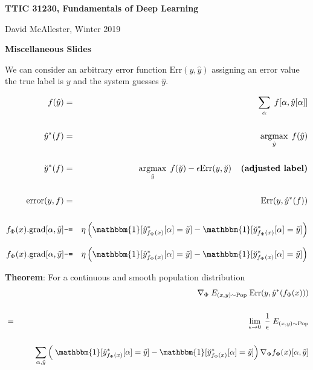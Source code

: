 




{\Huge

  \centerline{\bf TTIC 31230, Fundamentals of Deep Learning}
  \bigskip
  \centerline{David McAllester, Winter 2019}
  \vfill
  \centerline{\bf Miscellaneous Slides}
  
We can consider an arbitrary error function $\mathrm{Err}(y,\hat{y})$ assigning an error value the true label is $y$ and the system guesses $\hat{y}$.

\begin{eqnarray*}
  f(\hat{y}) & = & \sum_\alpha\; f[\alpha,\hat{y}[\alpha]] \\
  \\
  \hat{y}^*(f) & = & \argmax_{\hat{y}} \; f(\hat{y}) \\
  \\
  \breve{y}^*(f) & = & \argmax_{\breve{y}} \;f(\breve{y}) - \epsilon \mathrm{Err}(y,\breve{y}) \;\;\;\;\mbox{\bf (adjusted label)} \\
  \\
  \mathrm{error}(y,f) & = & \mathrm{Err}(y,\hat{y}^*(f)) \\
  \\
  f_\Phi(x).\mathrm{grad}[\alpha,\tilde{y}] & \minuseq & \eta\left(\mathbbm{1}[\hat{y}^*_{f_\Phi(x)}[\alpha] = \tilde{y}]
  - \mathbbm{1}[\breve{y}^*_{f_\Phi(x)}[\alpha] = \tilde{y}]\right) 
\end{eqnarray*}

\begin{eqnarray*}
    f_\Phi(x).\mathrm{grad}[\alpha,\tilde{y}] & \minuseq & \eta\left(\mathbbm{1}[\hat{y}^*_{f_\Phi(x)}[\alpha] = \tilde{y}]
  - \mathbbm{1}[\breve{y}^*_{f_\Phi(x)}[\alpha] = \tilde{y}]\right) 
\end{eqnarray*}

\vfill
{\bf Theorem}: For a continuous and smooth population distribution
\begin{eqnarray*}
  & & \nabla_\Phi  \;E_{(x,y) \sim \mathrm{Pop}}\;\mathrm{Err}(y,\hat{y}^*(f_\Phi(x))) \\
  \\
  & = & \lim_{\epsilon \rightarrow 0} \;\frac{1}{\epsilon}\; E_{(x,y) \sim \mathrm{Pop}} \\
  \\
  & & \;\;\;\;\;\;\sum_{\alpha,\tilde{y}} \left(\;\mathbbm{1}[\hat{y}^*_{f_\Phi(x)}[\alpha] = \tilde{y}]
  - \mathbbm{1}[\breve{y}^*_{f_\Phi(x)}[\alpha] = \tilde{y}] \right) \nabla_\Phi f_\Phi(x)[\alpha,\tilde{y}]
\end{eqnarray*}



}
